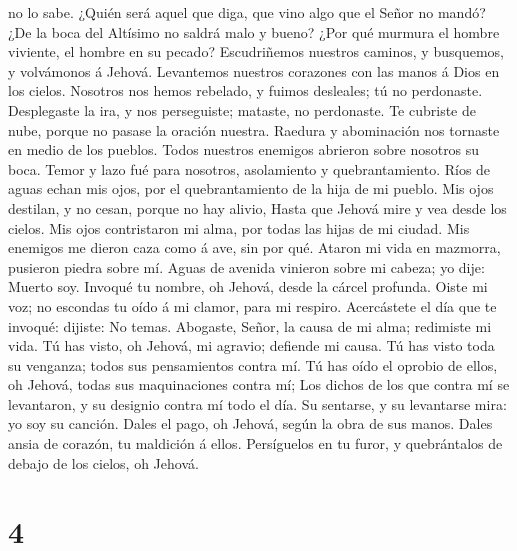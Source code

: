 no lo sabe.  ¿Quién será aquel que diga, que vino algo
que el Señor no mandó?  ¿De la boca del Altísimo no
saldrá malo y bueno?  ¿Por qué murmura el hombre
viviente, el hombre en su pecado?  Escudriñemos nuestros
caminos, y busquemos, y volvámonos á Jehová.  Levantemos
nuestros corazones con las manos á Dios en los cielos. 
Nosotros nos hemos rebelado, y fuimos desleales; tú no perdonaste.
 Desplegaste la ira, y nos perseguiste; mataste, no
perdonaste.  Te cubriste de nube, porque no pasase la
oración nuestra.  Raedura y abominación nos tornaste en
medio de los pueblos.  Todos nuestros enemigos abrieron
sobre nosotros su boca.  Temor y lazo fué para nosotros,
asolamiento y quebrantamiento.  Ríos de aguas echan mis
ojos, por el quebrantamiento de la hija de mi pueblo. 
Mis ojos destilan, y no cesan, porque no hay alivio, 
Hasta que Jehová mire y vea desde los cielos.  Mis ojos
contristaron mi alma, por todas las hijas de mi ciudad. 
Mis enemigos me dieron caza como á ave, sin por qué. 
Ataron mi vida en mazmorra, pusieron piedra sobre mí. 
Aguas de avenida vinieron sobre mi cabeza; yo dije: Muerto soy.
 Invoqué tu nombre, oh Jehová, desde la cárcel profunda.
 Oiste mi voz; no escondas tu oído á mi clamor, para mi
respiro.  Acercástete el día que te invoqué: dijiste: No
temas.  Abogaste, Señor, la causa de mi alma; redimiste
mi vida.  Tú has visto, oh Jehová, mi agravio; defiende
mi causa.  Tú has visto toda su venganza; todos sus
pensamientos contra mí.  Tú has oído el oprobio de ellos,
oh Jehová, todas sus maquinaciones contra mí;  Los dichos
de los que contra mí se levantaron, y su designio contra mí todo el día.
 Su sentarse, y su levantarse mira: yo soy su canción.
 Dales el pago, oh Jehová, según la obra de sus manos.
 Dales ansia de corazón, tu maldición á ellos.
 Persíguelos en tu furor, y quebrántalos de debajo de los
cielos, oh Jehová.

\hypertarget{section-3}{%
\section{4}\label{section-3}}

